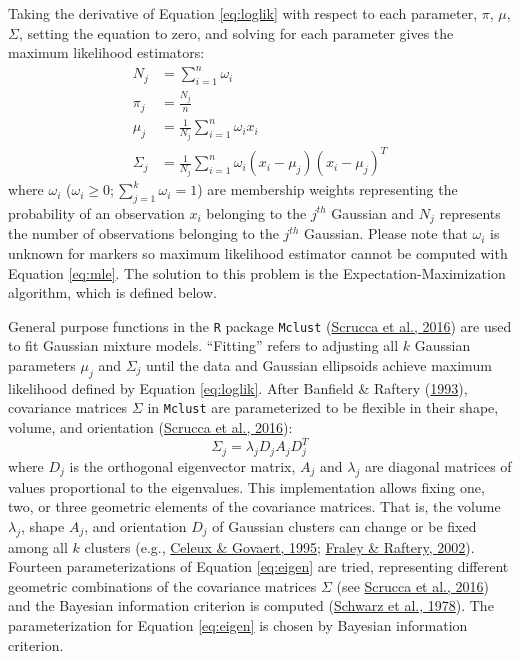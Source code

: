 Taking the derivative of Equation \eqref{eq:loglik} with respect to each parameter, \(\pi\), \(\mu\), \(\Sigma\), setting the equation to zero, and solving for each parameter gives the maximum likelihood estimators:
\begin{equation}
  \begin{aligned}
    N_j &= \sum_{i=1}^n \omega_{i} \\
    \pi_j &= \frac{N_j}{n} \\
    \mu_j &= \frac{1}{N_j} \sum_{i=1}^n \omega_{i} x_i \\
    \Sigma_j &= \frac{1}{N_j} \sum_{i=1}^n \omega_{i} (x_i - \mu_j)(x_i - \mu_j)^T
  \end{aligned}
  \label{eq:mle}
\end{equation}
where \(\omega_{i}\) (\(\omega_{i} \geq 0; \sum_{j=1}^k \omega_{i} = 1\)) are membership weights representing the probability of an observation \(x_i\) belonging to the \(j^{th}\) Gaussian and \(N_j\) represents the number of observations belonging to the \(j^{th}\) Gaussian. Please note that \(\omega_{i}\) is unknown for markers so maximum likelihood estimator cannot be computed with Equation \eqref{eq:mle}. The solution to this problem is the Expectation-Maximization algorithm, which is defined below.

General purpose functions in the \texttt{R} package \texttt{Mclust} (\protect\hyperlink{ref-scrucca2016}{Scrucca et al., 2016}) are used to fit Gaussian mixture models. ``Fitting'' refers to adjusting all \(k\) Gaussian parameters \(\mu_j\) and \(\Sigma_j\) until the data and Gaussian ellipsoids achieve maximum likelihood defined by Equation \eqref{eq:loglik}. After Banfield \& Raftery (\protect\hyperlink{ref-banfield1993}{1993}), covariance matrices \(\Sigma\) in \texttt{Mclust} are parameterized to be flexible in their shape, volume, and orientation (\protect\hyperlink{ref-scrucca2016}{Scrucca et al., 2016}):
\begin{equation}
  \Sigma_j = \lambda_j D_j A_j D_j^T
  \label{eq:eigen}
\end{equation}
where \(D_j\) is the orthogonal eigenvector matrix, \(A_j\) and \(\lambda_j\) are diagonal matrices of values proportional to the eigenvalues. This implementation allows fixing one, two, or three geometric elements of the covariance matrices. That is, the volume \(\lambda_j\), shape \(A_j\), and orientation \(D_j\) of Gaussian clusters can change or be fixed among all \(k\) clusters (e.g., \protect\hyperlink{ref-celeux1995}{Celeux \& Govaert, 1995}; \protect\hyperlink{ref-fraley2002}{Fraley \& Raftery, 2002}). Fourteen parameterizations of Equation \eqref{eq:eigen} are tried, representing different geometric combinations of the covariance matrices \(\Sigma\) (see \protect\hyperlink{ref-scrucca2016}{Scrucca et al., 2016}) and the Bayesian information criterion is computed (\protect\hyperlink{ref-schwarz1978}{Schwarz et al., 1978}). The parameterization for Equation \eqref{eq:eigen} is chosen by Bayesian information criterion.

